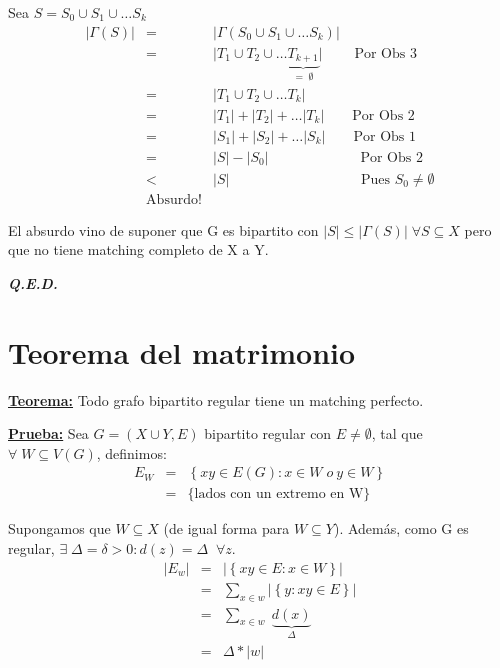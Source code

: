 \documentclass[12pt,a4paper]{report}
\newcounter{neq}
\newcommand{\QED}{\hfill \textit{\textbf{Q.E.D.}}}
\begin{document}
  			\par Sea $S = S_{0} \cup S_{1} \cup \dotsc S_{k}$
  				\begin{eqnarray}
  					\nonumber \lvert \Gamma(S) \rvert &=& \lvert \Gamma(S_{0} \cup S_{1} \cup \dotsc S_{k}) \rvert \\
  					\nonumber &=& \lvert T_{1} \cup T_{2} \cup \dotsc \underbrace{T_{k+1}}_{= \; \emptyset} \rvert \qquad \; \text{Por Obs 3} \\
  					\nonumber &=& \lvert T_{1} \cup T_{2} \cup \dotsc T_{k} \rvert \\
  					\nonumber &=& \lvert T_{1} \rvert + \lvert T_{2} \rvert + \dotsc \lvert T_{k} \rvert \qquad \text{Por Obs 2} \\
  					\nonumber &=& \lvert S_{1} \rvert + \lvert S_{2} \rvert + \dotsc \lvert S_{k} \rvert \qquad \text{Por Obs 1} \\
  					\nonumber &=& \lvert S \rvert - \lvert S_{0} \rvert \qquad \qquad \qquad \; \; \text{Por Obs 2} \\
  					\nonumber &<& \lvert S \rvert \qquad \qquad \qquad \qquad \; \; \; \; \;\text{Pues } S_{0} \neq \emptyset \\
  					\nonumber & \text{Absurdo!} &
  				\end{eqnarray}

  			\par El absurdo vino de suponer que G es bipartito con $\lvert S \rvert \leq \lvert \Gamma(S) \rvert \; \forall S \subseteq X$ pero que no tiene matching completo de X a Y.

  		\QED

  	\pagebreak
  	\section{Teorema del matrimonio}
  		\textbf{\underline{Teorema:}} Todo grafo bipartito regular tiene un matching perfecto.

  		\textbf{\underline{Prueba:}} Sea $G = (X \cup Y, E)$ bipartito regular con $E \neq \emptyset $, tal que $\forall \; W \subseteq V(G)$, definimos:
  			\begin{eqnarray}
  				\nonumber E_{W} &=& \left\lbrace xy \in E(G): x \in W \; o \ y \in W \right\rbrace \\
  				\nonumber &=& \lbrace \text{lados con un extremo en W} \rbrace
  			\end{eqnarray}

  			\par Supongamos que $W \subseteq X$ (de igual forma para $W \subseteq Y$). Además, como G es regular, $\exists \; \Delta  = \delta > 0 : d(z) = \Delta \; \; \forall z$.
  			\begin{eqnarray}
  				\nonumber \lvert E_{w} \rvert &=& \lvert \left\lbrace xy \in E: x \in W \right\rbrace \rvert \\
  				\nonumber &=& \sum_{x \in w} \lvert \left\lbrace y : xy \in E \right\rbrace \rvert \\
  				\nonumber &=& \sum_{x \in w} \; \underbrace{d(x)}_{\Delta} \\
  				\nonumber &=& \Delta * \lvert w \rvert
  			\end{eqnarray}
\end{document}
